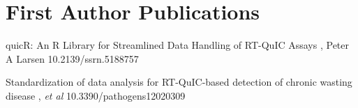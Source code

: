 \documentclass{resume}
\begin{document}
    \section{First Author Publications}
        \begin{samepage}
            {quicR: An R Library for Streamlined Data Handling of RT-QuIC Assays}
            {\me, Peter A Larsen}
            {10.2139/ssrn.5188757}

            {Standardization of data analysis for RT-QuIC-based detection of chronic wasting disease}
            {\me, \textit{et al}}
            {10.3390/pathogens12020309}
        \end{samepage}


\end{document}
